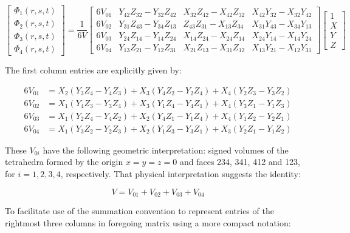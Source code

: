 \begin{equation}
\begin{bmatrix}
\Phi_1(r,s,t)\\
\Phi_2(r,s,t)\\
\Phi_3(r,s,t)\\
\Phi_4(r,s,t)
\end{bmatrix} = \dfrac{1}{6V} \begin{bmatrix}
6V_{01} & Y_{42}Z_{32}-Y_{32}Z_{42} & X_{32}Z_42-X_{42}Z_{32} & X_{42}Y_{32}-X_{32}Y_{42} \\
6V_{02} & Y_{31}Z_{43}-Y_{34}Z_{13} & Z_{43}Z_{31}-X_{13}Z_{34} & X_{31}Y_{43}-X_{34}Y_{13}\\
6V_{03} & Y_{24}Z_{14}-Y_{14}Z_{24} & X_{14}Z_{24}-X_{24}Z_{14} & X_{24}Y_{14}-X_{14}Y_{24}\\
6V_{04} & Y_{13}Z_{21}-Y_{12}Z_{31} & X_{21}Z_{13}-X_{31}Z_{12} & X_{13}Y_{21}-X_{12}Y_{31}
\end{bmatrix} \begin{bmatrix}
1\\
X\\
Y\\
Z
\end{bmatrix}
\end{equation}

The first column entries are explicitly given by:

\begin{align*}
6V_{01} &= X_2(Y_3 Z_4- Y_4 Z_3) + X_3(Y_4 Z_2 - Y_2 Z_4) + X_4(Y_2 Z_3 - Y_3 Z_2)\\
6V_{02} &= X_1(Y_4 Z_3 - Y_3 Z_4) + X_3(Y_1 Z_4 - Y_4 Z_1) + X_4(Y_3 Z_1 - Y_1 Z_3)\\
6V_{03} &= X_1(Y_2 Z_4 - Y_4 Z_2) + X_2(Y_4 Z_1 - Y_1 Z_4) + X_4(Y_1 Z_2 - Y_2 Z_1)\\
6V_{04} &= X_1(Y_3 Z_2 - Y_2 Z_3) + X_2(Y_1 Z_3 - Y_3 Z_1) + X_3(Y_2 Z_1 - Y_1 Z_2)
\end{align*}

These $ V_{0i} $ have the following geometric interpretation: signed volumes of the tetrahedra formed by the origin $ x=y=z=0 $ and faces 234, 341, 412 and 123, for $ i=1,2,3,4 $, respectively. That physical interpretation suggests the identity:

\begin{equation}
V = V_{01} + V_{02} + V_{03} + V_{04}
\end{equation}

To facilitate use of the summation convention to represent entries of the rightmost three columns in foregoing matrix using a more compact notation:

